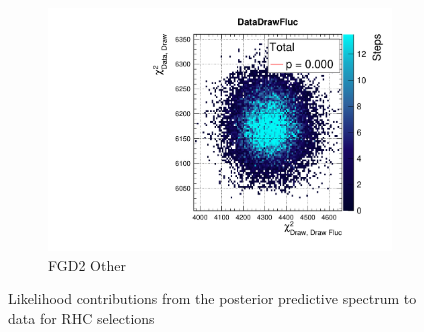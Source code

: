 \begin{figure}[h]
\begin{subfigure}[t]{0.32\textwidth}
		\includegraphics[width=\textwidth, trim={20mm 6mm 4mm 11mm}, clip,page=106]{figures/mach3/2018/data/2018a_FixedCov_RedCov_Mpi_Data_merge_PostPredStore_FullLLH_procs}
		\caption{FGD2 \numubar Other}
	\end{subfigure}
	\caption{Likelihood contributions from the posterior predictive spectrum to data for RHC \numubar selections}
	\label{fig:posterior_pred_data_rhc_2018}
\end{figure}

